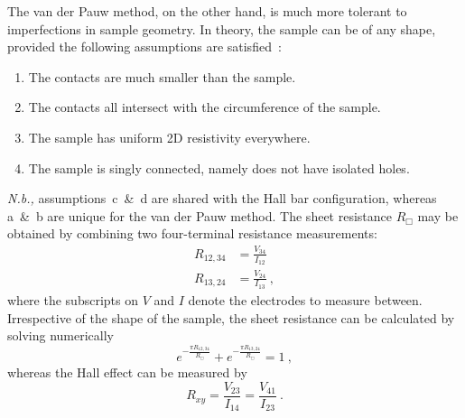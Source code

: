 The van der Pauw method, on the other hand, is much more tolerant to imperfections in sample geometry. In theory, the sample can be of any shape, provided the following assumptions are satisfied~\cite{VdP1958}:%
\begin{enumerate}[label={\alph*)}]
    \item The contacts are much smaller than the sample.
    \item The contacts all intersect with the circumference of the sample.
    \item The sample has uniform 2D resistivity everywhere.
    \item The sample is singly connected, namely does not have isolated holes.
\end{enumerate}%
\textit{N.b.,} assumptions~c~\&~d are shared with the Hall bar configuration, whereas a~\&~b are unique for the van der Pauw method. The sheet resistance $R_\Box$ may be obtained by combining two four-terminal resistance measurements: %
\begin{align}
    R_{12,34} &= \frac{V_{34}}{I_{12}}\nonumber\\
    R_{13,24} &= \frac{V_{24}}{I_{13}}~,
\end{align}%
where the subscripts on $V$ and $I$ denote the electrodes to measure between. Irrespective of the shape of the sample, the sheet resistance can be calculated by solving numerically%
\begin{equation}\label{eq:vdp_full}
	e^{-\frac{\pi{}R_{12,34}}{R_\Box}} + e^{-\frac{\pi{}R_{13,24}}{R_\Box}} = 1~,
\end{equation}
whereas the Hall effect can be measured by
\begin{equation}\label{eq:vdp_hall}
	R_{xy} = \frac{V_{23}}{I_{14}} = \frac{V_{41}}{I_{23}}~.
\end{equation}

